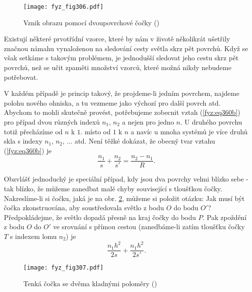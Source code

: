     \begin{figure}[ht!] %
      \centering
      \texttt{[image: fyz\_fig306.pdf]}
      \caption{Vznik obrazu pomocí dvoupovrchové čočky
               (\cite[s.~355]{Feynman01})}
      \label{fyz:fig306}
    \end{figure}
    
    Existují některé prvotřídní vzorce, které by nám v životě několikrát ušetřily značnou námahu 
    vynaloženou na sledování cesty světla skrz pět povrchů. Když se však setkáme s takovým 
    problémem, je jednodušší sledovat jeho cestu skrz pět povrchů, než se učit zpaměti množství 
    vzorců, které možná nikdy nebudeme potřebovat.
    
    V každém případě je princip takový, že projdeme-li jedním povrchem, najdeme polohu nového 
    ohniska, a tu vezmeme jako výchozí pro další povrch atd. Abychom to mohli skutečně provést, 
    potřebujeme zobecnit vztah (\ref{fyz:eq360b}) pro případ dvou různých indexů \(n_1\), \(n_2\) a 
    nejen pro jedno \(n\). U druhého povrchu totiž přecházíme od 	\(n\) k \(1\). místo od \(1\) k 
    \(n\) a navíc u mnoha systémů je více druhů skla s indexy \(n_1\), \(n_2\), ... atd. Není těžké 
    dokázat, že obecný tvar vztahu (\ref{fyz:eq360b}) je
    \begin{equation}  \label{fyz:eq364}
      \frac{n_1}{s} + \frac{n_2}{s'} = \frac{n_2-n_1}{R}.    
    \end{equation}
    
    Obzvlášť jednoduchý je speciální případ, kdy jsou dva povrchy velmi blízko sebe - tak blízko, 
    že můžeme zanedbat malé chyby související s tloušťkou čočky. Nakreslíme-li si čočku, jaká je na 
    obr. \ref{fyz:fig307}, můžeme si položit otázku: Jak musí být čočka zkonstruována, aby 
    soustředovala světlo z bodu \(O\) do bodu \(O'\)? Předpokládejme, že světlo dopadá přesně na 
    kraj čočky do bodu \(P\). Pak zpoždění z bodu \(O\) do \(O'\) ve srovnání s přímou cestou 
    (zanedbáme-li zatím tloušťku čočky \(T\) s indexem lomu \(n_2\)) je
    \begin{equation}  \label{fyz:eq365}
      \frac{n_1h^2}{2s} + \frac{n_1h^2}{2s'}.
    \end{equation}
    
    \begin{figure}[ht!] %
       \centering
       \texttt{[image: fyz\_fig307.pdf]}
       \caption{Tenká čočka se dvěma kladnými poloměry
               (\cite[s.~355]{Feynman01})}
       \label{fyz:fig307}
    \end{figure}
    
